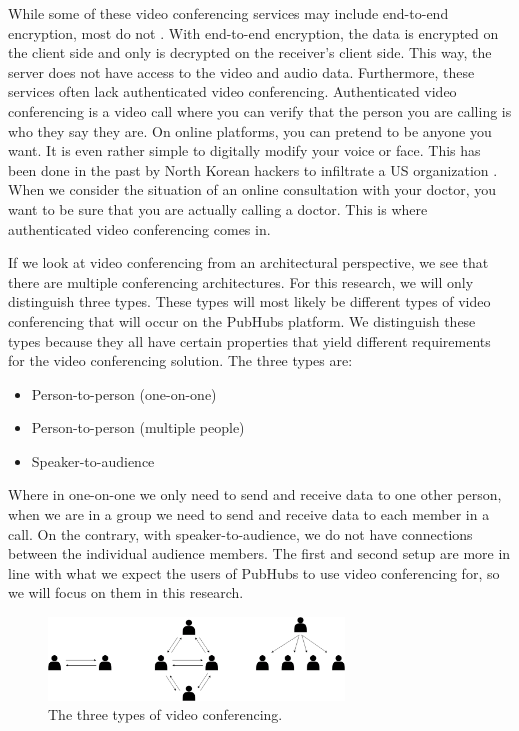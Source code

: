 \documentclass{report}
\begin{document}
While some of these video conferencing services may include end-to-end encryption, most do not \cite{gauthier_dynamic_2021}.
With end-to-end encryption, the data is encrypted on the client side and only is decrypted on the receiver's client
side. This way, the server does not have access to the video and audio data. Furthermore,
these services often lack authenticated video conferencing. Authenticated video conferencing is a video
call where you can verify that the person you are calling is who they say they are.
On online platforms, you can pretend to be anyone you want. It is even rather simple to digitally
modify your voice or face. This has been done in the past by North Korean hackers to infiltrate a US organization \cite{
noauthor_how_nodate}. When we consider the situation of an online consultation with your doctor,
you want to be sure that you are actually calling a doctor. This is where authenticated video conferencing comes in.

If we look at video conferencing from an architectural perspective, we see that there are multiple conferencing
architectures. For this research, we will only distinguish three types. These types will most likely be different types
of video conferencing that will occur on the PubHubs platform. We distinguish these types because
they all have certain properties that yield different requirements for the video conferencing solution. The three
types are:

\begin{itemize}
\item Person-to-person (one-on-one)
\item Person-to-person (multiple people)
\item Speaker-to-audience
\end{itemize}

Where in one-on-one we only need to send and receive data to one other person, when we are in a
group we need to send and receive data to each member in a call. On the contrary, with speaker-to-audience, we do
not have connections between the individual audience members. The first and second setup are more in line with what
we expect the users of PubHubs to use video conferencing for, so we will focus on them in this research.

\begin{figure}[!hbt]
\centering
\includegraphics[width=0.7\textwidth]{img/three-types}
\caption{The three types of video conferencing.}
\label{fig:three-types-video-conferencing}
\end{figure}
\end{document}
